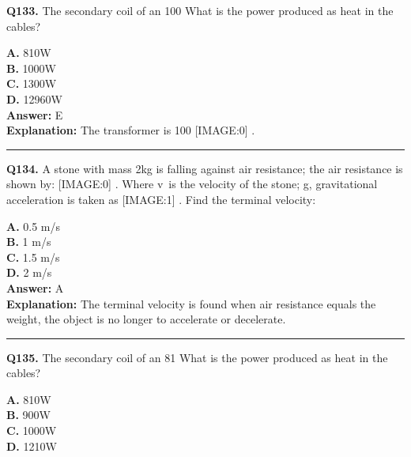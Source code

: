 \documentclass[12pt]{article}
\begin{document}
\noindent
\textbf{Q133.} The secondary coil of an 100%
What is the power produced as heat in the cables?



\textbf{A.} 810W \\
\textbf{B.} 1000W \\
\textbf{C.} 1300W \\
\textbf{D.} 12960W \\

\textbf{Answer:} E \\
\textbf{Explanation:} The transformer is 100%
[IMAGE:0]
.

\hrule
\vspace{1em}


\noindent
\textbf{Q134.} A stone with mass 2kg is falling against air resistance; the air resistance is shown by:
[IMAGE:0]
.
Where v is the velocity of the stone; g, gravitational acceleration is taken as
[IMAGE:1]
. Find the terminal velocity:



\textbf{A.} 0.5 m/s \\
\textbf{B.} 1 m/s \\
\textbf{C.} 1.5 m/s \\
\textbf{D.} 2 m/s \\

\textbf{Answer:} A \\
\textbf{Explanation:} The terminal velocity is found when air resistance equals the weight, the object is no longer to accelerate or decelerate.

\hrule
\vspace{1em}


\noindent
\textbf{Q135.} The secondary coil of an 81%
What is the power produced as heat in the cables?



\textbf{A.} 810W \\
\textbf{B.} 900W \\
\textbf{C.} 1000W \\
\textbf{D.} 1210W \\
\end{document}
